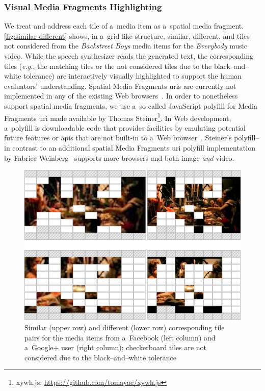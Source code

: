 \documentclass{article}
\begin{document}
\subsubsection{Visual Media Fragments Highlighting}
We treat and address each tile of a~media item as a~spatial media fragment. \autoref{fig:similar-different} shows, in a~grid-like structure, similar, different, and tiles not considered from the \emph{Backstreet Boys} media items for the \emph{Everybody} music video. While the speech synthesizer reads the generated text, the corresponding tiles (\emph{e.g.}, the matching tiles or the not considered tiles due to the black--and--white tolerance) are interactively visually highlighted to support the human evaluators' understanding. Spatial Media Fragments {\sc uri}s are currently not implemented in any of the existing Web browsers~\cite{weinberg2013polyfill}. In order to nonetheless support spatial media fragments, we use a~so-called JavaScript polyfill for Media Fragments {\sc uri} made available by Thomas Steiner\footnote{xywh.js: \url{https://github.com/tomayac/xywh.js}}. In Web development, a~polyfill is downloadable code that provides facilities by emulating potential future features or {\sc api}s that are not built-in to a~Web browser~\cite{sharp2010polyfill}. Steiner's polyfill--in contrast to an additional spatial Media Fragments {\sc uri} polyfill implementation~\cite{weinberg2013polyfill} by Fabrice Weinberg-- supports more browsers and both image \emph{and} video.

\begin{figure}[t!]
  \centering
  \includegraphics[width=0.75\linewidth]{./similar-different.png}
  \caption{Similar (upper row) and different (lower row) corresponding tile pairs for the media items from a~Facebook (left column) and a~Google+ user (right column); checkerboard tiles are not considered due to the black--and--white tolerance}
  \label{fig:similar-different}
\end{figure}
\end{document}

